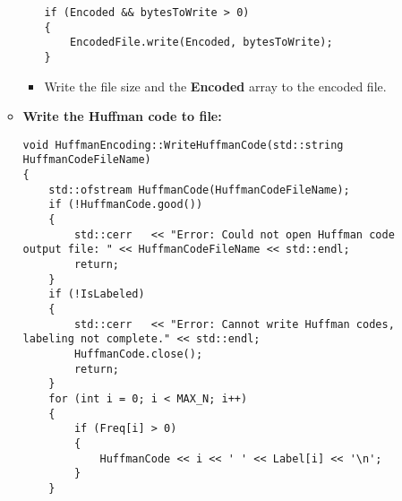 \begin{enumerate}[label=\textbf{\Alph*.}]
\begin{itemize}
\begin{itemize}
\begin{verbatim}
if (Encoded && bytesToWrite > 0)
{
    EncodedFile.write(Encoded, bytesToWrite);
}
\end{verbatim}
            \item Write the file size and the \textbf{Encoded} array to the encoded file.
        \end{itemize}
        \newpage
        \item \textbf{Write the Huffman code to file:}
\begin{verbatim}
void HuffmanEncoding::WriteHuffmanCode(std::string HuffmanCodeFileName)
{
    std::ofstream HuffmanCode(HuffmanCodeFileName);
    if (!HuffmanCode.good())
    {
        std::cerr   << "Error: Could not open Huffman code output file: " << HuffmanCodeFileName << std::endl;
        return;
    }
    if (!IsLabeled)
    {
        std::cerr   << "Error: Cannot write Huffman codes, labeling not complete." << std::endl;
        HuffmanCode.close();
        return;
    }
    for (int i = 0; i < MAX_N; i++)
    {
        if (Freq[i] > 0)
        {
            HuffmanCode << i << ' ' << Label[i] << '\n';
        }
    }


\end{verbatim}
\end{itemize}
\end{enumerate}
